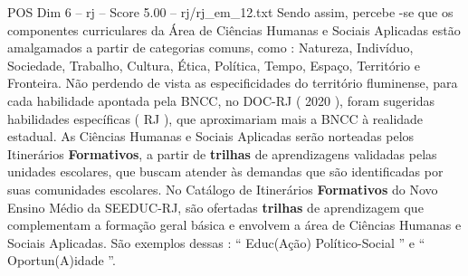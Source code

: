 \begin{textsample}{POS Dim 6 – rj – Score 5.00 – rj/rj\_em\_12.txt}
Sendo assim, percebe -se que os componentes curriculares da Área de Ciências Humanas e Sociais Aplicadas estão amalgamados a partir de categorias comuns, como : Natureza, Indivíduo, Sociedade, Trabalho, Cultura, Ética, Política, Tempo, Espaço, Território e Fronteira.
Não perdendo de vista as especificidades do território fluminense, para cada habilidade apontada pela BNCC, no DOC-RJ ( 2020 ), foram sugeridas habilidades específicas ( RJ ), que aproximariam mais a BNCC à realidade estadual.
As Ciências Humanas e Sociais Aplicadas serão norteadas pelos Itinerários \textbf{Formativos}, a partir de \textbf{trilhas} de aprendizagens validadas pelas unidades escolares, que buscam atender às demandas que são identificadas por suas comunidades escolares.
No Catálogo de Itinerários \textbf{Formativos} do Novo Ensino Médio da SEEDUC-RJ, são ofertadas \textbf{trilhas} de aprendizagem que complementam a formação geral básica e envolvem a área de Ciências Humanas e Sociais Aplicadas.
São exemplos dessas : “ Educ(Ação) Político-Social ” e “ Oportun(A)idade ”.

\end{textsample}
